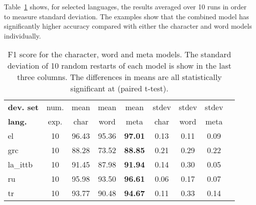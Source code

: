 \documentclass[11pt,a4paper]{article}
\begin{document}
Table~\ref{tab:ablation-charword} shows, for selected languages, the results averaged over 10 runs in order to measure standard deviation. The examples show that the combined model has significantly higher accuracy compared with either the character and word models individually. 

\begin{table}[t!]
\begin{center}
\small
\setlength{\tabcolsep}{3.5pt}
\begin{tabular}{|l|c|c|c|c||c|c|c|c}
\hline 
 \bf dev. set   & num.      & mean & mean & mean & stdev & stdev & stdev\\ 
 \bf lang.     & exp.      & char & word & meta & char & word  & meta  \\ 
\hline
el       & 10     & 96.43& 95.36&\bf 97.01& 0.13 &0.11 & 0.09\\
grc      & 10     & 88.28& 73.52&\bf88.85 & 0.21 &0.29 & 0.22\\
la\_ittb & 10     & 91.45& 87.98&\bf 91.94 & 0.14 &0.30 & 0.05\\
ru       & 10     & 95.98& 93.50&\bf 96.61& 0.06 &0.17 & 0.07\\
tr       & 10     & 93.77& 90.48&\bf 94.67& 0.11 &0.33 & 0.14\\
 \hline
\end{tabular}
\end{center}

\caption{F1 score for the character, word and meta models. The standard deviation of 10 random restarts of each model is show in the last three columns. The differences in means are all statistically significant at {} (paired t-test). }
\label{tab:ablation-charword}
\end{table}
\end{document}
